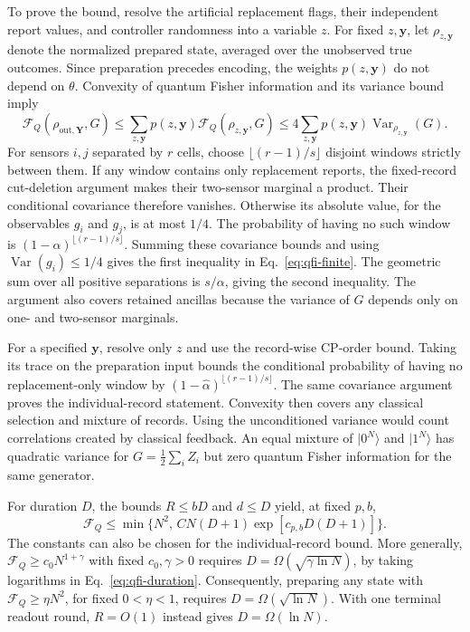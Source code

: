 \documentclass[aps,prl,twocolumn,superscriptaddress,longbibliography,reprint,floatfix]{revtex4-2}
\newcommand{\ket}[1]{\lvert #1\rangle}
\newcommand{\FQ}{\mathcal F_Q}
\begin{document}
To prove the bound, resolve the artificial replacement flags, their
independent report values, and controller randomness into a variable $z$.
For fixed $z,\boldsymbol y$, let $\rho_{z,\boldsymbol y}$ denote the normalized prepared state,
averaged over the unobserved true outcomes. Since preparation precedes
encoding, the weights $p(z,\boldsymbol y)$ do not depend on $\theta$. Convexity of
quantum Fisher information and its variance bound imply
\begin{equation}
 \FQ(\rho_{\mathrm{out},\boldsymbol Y},G)
 \le\sum_{z,\boldsymbol y}p(z,\boldsymbol y)\FQ(\rho_{z,\boldsymbol y},G)
 \le4\sum_{z,\boldsymbol y}p(z,\boldsymbol y)
          \operatorname{Var}_{\rho_{z,\boldsymbol y}}(G).
 \label{eq:qfi-conditional-variance}
\end{equation}
For sensors $i,j$ separated by $r$ cells, choose
$\lfloor(r-1)/s\rfloor$ disjoint windows strictly between them.
If any window contains only replacement reports, the fixed-record
cut-deletion argument makes their two-sensor marginal a product.
Their conditional covariance therefore vanishes. Otherwise its absolute
value, for the observables $g_i$ and $g_j$, is at most $1/4$.
The probability of having no such window is
$(1-\alpha)^{\lfloor(r-1)/s\rfloor}$.
Summing these covariance bounds and using
$\operatorname{Var}(g_i)\le1/4$ gives the first inequality in
Eq.~\eqref{eq:qfi-finite}. The geometric sum over all positive separations
is $s/\alpha$, giving the second inequality. The argument also covers retained ancillas because the variance of $G$
depends only on one- and two-sensor marginals.

For a specified $\boldsymbol y$, resolve only $z$ and use the record-wise CP-order
bound. Taking its trace on the preparation input bounds the conditional
probability of having no replacement-only window by
$(1-\widehat\alpha)^{\lfloor(r-1)/s\rfloor}$.
The same covariance argument proves the individual-record statement.
Convexity then covers any classical selection and mixture of records.
Using the unconditioned variance would count correlations created by
classical feedback. An equal mixture of $\ket{0^N}$ and $\ket{1^N}$
has quadratic variance for $G=\frac12\sum_i Z_i$ but zero quantum
Fisher information for the same generator.

For duration $D$, the bounds $R\le bD$ and $d\le D$ yield, at fixed $p,b$,
\begin{equation}
 \FQ\le\min\{N^2,\,
 C N(D+1)\exp[c_{p,b}D(D+1)]\}.
 \label{eq:qfi-duration}
\end{equation}
The constants can also be chosen for the individual-record bound.
More generally, $\FQ\ge c_0N^{1+\gamma}$ with fixed $c_0,\gamma>0$
requires $D=\Omega(\sqrt{\gamma\ln N})$, by taking logarithms
in Eq.~\eqref{eq:qfi-duration}.
Consequently, preparing any state with $\FQ\ge\eta N^2$, for fixed
$0<\eta<1$, requires $D=\Omega(\sqrt{\ln N})$.
With one terminal readout round, $R=O(1)$ instead gives
$D=\Omega(\ln N)$.
\end{document}
